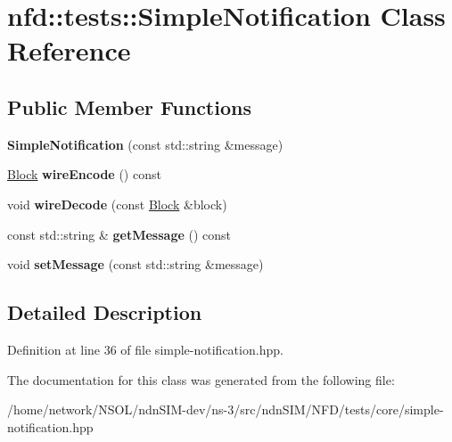 \hypertarget{classnfd_1_1tests_1_1SimpleNotification}{}\section{nfd\+:\+:tests\+:\+:Simple\+Notification Class Reference}
\label{classnfd_1_1tests_1_1SimpleNotification}
\subsection*{Public Member Functions}
\begin{DoxyCompactItemize}
\item 
{\bfseries Simple\+Notification} (const std\+::string \&message)\hypertarget{classnfd_1_1tests_1_1SimpleNotification_a6250d803b3ef2f288093538b784c4af2}{}\label{classnfd_1_1tests_1_1SimpleNotification_a6250d803b3ef2f288093538b784c4af2}

\item 
\hyperlink{classndn_1_1Block}{Block} {\bfseries wire\+Encode} () const\hypertarget{classnfd_1_1tests_1_1SimpleNotification_a8b5a8000754b96814e2b1c76dcba4f59}{}\label{classnfd_1_1tests_1_1SimpleNotification_a8b5a8000754b96814e2b1c76dcba4f59}

\item 
void {\bfseries wire\+Decode} (const \hyperlink{classndn_1_1Block}{Block} \&block)\hypertarget{classnfd_1_1tests_1_1SimpleNotification_a906a355a91e85f1aa7612cb8e757a6f4}{}\label{classnfd_1_1tests_1_1SimpleNotification_a906a355a91e85f1aa7612cb8e757a6f4}

\item 
const std\+::string \& {\bfseries get\+Message} () const\hypertarget{classnfd_1_1tests_1_1SimpleNotification_a742bd6a5b72ff0aac476447545d992a6}{}\label{classnfd_1_1tests_1_1SimpleNotification_a742bd6a5b72ff0aac476447545d992a6}

\item 
void {\bfseries set\+Message} (const std\+::string \&message)\hypertarget{classnfd_1_1tests_1_1SimpleNotification_ac3fb7a1f0597dbf69eaebd4b9d085611}{}\label{classnfd_1_1tests_1_1SimpleNotification_ac3fb7a1f0597dbf69eaebd4b9d085611}

\end{DoxyCompactItemize}


\subsection{Detailed Description}


Definition at line 36 of file simple-\/notification.\+hpp.



The documentation for this class was generated from the following file\+:\begin{DoxyCompactItemize}
\item 
/home/network/\+N\+S\+O\+L/ndn\+S\+I\+M-\/dev/ns-\/3/src/ndn\+S\+I\+M/\+N\+F\+D/tests/core/simple-\/notification.\+hpp\end{DoxyCompactItemize}
